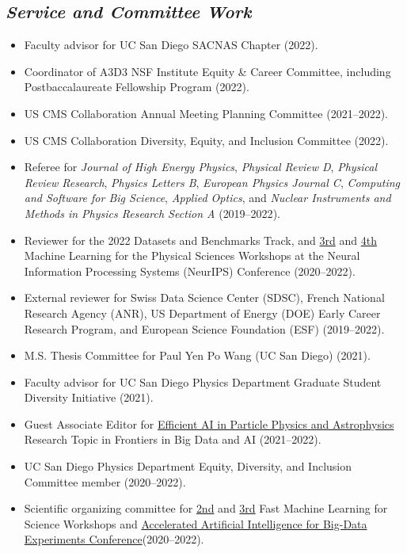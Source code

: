 \documentclass[11pt]{res}
\newcommand{\MarginText}[1]{\section{\textit{#1}}}
\begin{document}
\begin{resume}
  \MarginText{Service and Committee Work}

  \begin{itemize}
    \itemsep-0.3em
    \item Faculty advisor for UC San Diego SACNAS Chapter ({2022}).
    \item Coordinator of A3D3 NSF Institute Equity \& Career Committee, including Postbaccalaureate Fellowship Program ({2022}).
    \item US CMS Collaboration Annual Meeting Planning Committee ({2021--2022}).
    \item US CMS Collaboration Diversity, Equity, and Inclusion Committee ({2022}).
    \item Referee for \emph{Journal of High Energy Physics}, \emph{Physical Review D}, \emph{Physical Review Research}, \emph{Physics Letters B}, \emph{European Physics Journal C}, \emph{Computing and Software for Big Science}, \emph{Applied Optics}, and \emph{Nuclear Instruments and Methods in Physics Research Section A} ({2019--2022}).
    \item Reviewer for the 2022 Datasets and Benchmarks Track, and \href{https://ml4physicalsciences.github.io/2020/}{3rd} and \href{https://ml4physicalsciences.github.io/2021/}{4th} Machine Learning for the Physical Sciences Workshops at the Neural Information Processing Systems (NeurIPS) Conference ({2020--2022}).
    \item External reviewer for Swiss Data Science Center (SDSC), French National Research Agency (ANR), US Department of Energy (DOE) Early Career Research Program, and European Science Foundation (ESF) ({2019--2022}).
    \item M.S. Thesis Committee for Paul Yen Po Wang (UC San Diego) ({2021}).
    \item Faculty advisor for UC San Diego Physics Department Graduate Student Diversity Initiative ({2021}).
    \item Guest Associate Editor for \href{https://www.frontiersin.org/research-topics/19095/efficient-ai-in-particle-physics-and-astrophysics}{Efficient AI in Particle Physics and Astrophysics} Research Topic in Frontiers in Big Data and AI ({2021--2022}).
    \item UC San Diego Physics Department Equity, Diversity, and Inclusion Committee member ({2020--2022}).
    \item Scientific organizing committee for \href{https://indico.cern.ch/e/fml2020}{2nd} and \href{https://indico.cern.ch/e/fml2022}{3rd} Fast Machine Learning for Science Workshops and \href{http://www.ncsa.illinois.edu/Conferences/AcceleratedAINCSA/}{Accelerated Artificial Intelligence for Big-Data Experiments Conference}({2020--2022}).

\end{itemize}
\end{resume}
\end{document}
